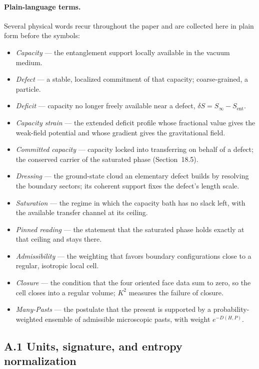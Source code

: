 \documentclass[11pt]{article}
\begin{document}
\paragraph{Plain-language terms.}
Several physical words recur throughout the paper and are collected here in plain form before the symbols:
\begin{itemize}
\item \emph{Capacity} --- the entanglement support locally available in the vacuum medium.
\item \emph{Defect} --- a stable, localized commitment of that capacity; coarse-grained, a particle.
\item \emph{Deficit} --- capacity no longer freely available near a defect, $\delta S=S_\infty-S_{\mathrm{ent}}$.
\item \emph{Capacity strain} --- the extended deficit profile whose fractional value gives the weak-field potential and whose gradient gives the gravitational field.
\item \emph{Committed capacity} --- capacity locked into transferring on behalf of a defect; the conserved carrier of the saturated phase (Section~18.5).
\item \emph{Dressing} --- the ground-state cloud an elementary defect builds by resolving the boundary sectors; its coherent support fixes the defect's length scale.
\item \emph{Saturation} --- the regime in which the capacity bath has no slack left, with the available transfer channel at its ceiling.
\item \emph{Pinned reading} --- the statement that the saturated phase holds exactly at that ceiling and stays there.
\item \emph{Admissibility} --- the weighting that favors boundary configurations close to a regular, isotropic local cell.
\item \emph{Closure} --- the condition that the four oriented face data sum to zero, so the cell closes into a regular volume; $K^2$ measures the failure of closure.
\item \emph{Many-Pasts} --- the postulate that the present is supported by a probability-weighted ensemble of admissible microscopic pasts, with weight $e^{-D(H,P)}$.
\end{itemize}

\subsection*{A.1 Units, signature, and entropy normalization}
\end{document}
